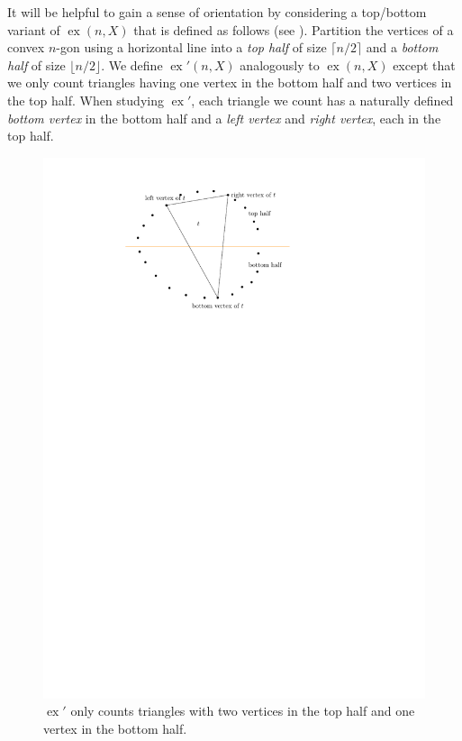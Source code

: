 \documentclass{patmorin}
\DeclareMathOperator{\ex}{ex}
\begin{document}
It will be helpful to gain a sense of orientation by considering
a top/bottom variant of $\ex(n,X)$ that is defined as follows (see
).  Partition the vertices of a convex $n$-gon using
a horizontal line into a \emph{top half} of size $\lceil n/2\rceil$
and a \emph{bottom half} of size $\lfloor n/2\rfloor$.  We define
$\ex'(n,X)$ analogously to $\ex(n,X)$ except that we only count triangles
having one vertex in the bottom half and two vertices in the top half.
When studying $\ex'$, each triangle we count has a naturally defined
\emph{bottom vertex} in the bottom half and a \emph{left vertex} and
\emph{right vertex}, each in the top half.

\begin{figure}
  \begin{center}
    \includegraphics{figs/left-right}
  \end{center}
  \caption{$\ex'$ only counts triangles with two vertices in the top half
     and one vertex in the bottom half.}
\end{figure}
\end{document}

